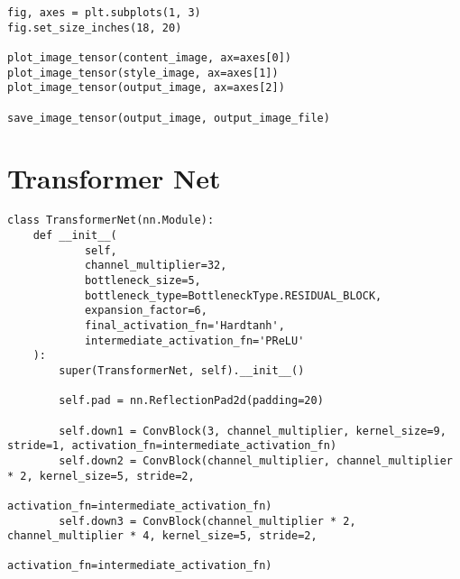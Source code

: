 \pagebreak

\begin{listing}[ht]
\begin{verbatim}
fig, axes = plt.subplots(1, 3)
fig.set_size_inches(18, 20)

plot_image_tensor(content_image, ax=axes[0])
plot_image_tensor(style_image, ax=axes[1])
plot_image_tensor(output_image, ax=axes[2])

save_image_tensor(output_image, output_image_file)
\end{verbatim}
\label{lst:neural_style_transfer_6}
\end{listing}

\pagebreak


\section{Transformer Net}
\label{sec:transformer_net_full}


\begin{listing}[ht]
\begin{verbatim}
class TransformerNet(nn.Module):
    def __init__(
            self,
            channel_multiplier=32,
            bottleneck_size=5,
            bottleneck_type=BottleneckType.RESIDUAL_BLOCK,
            expansion_factor=6,
            final_activation_fn='Hardtanh',
            intermediate_activation_fn='PReLU'
    ):
        super(TransformerNet, self).__init__()

        self.pad = nn.ReflectionPad2d(padding=20)

        self.down1 = ConvBlock(3, channel_multiplier, kernel_size=9, stride=1, activation_fn=intermediate_activation_fn)
        self.down2 = ConvBlock(channel_multiplier, channel_multiplier * 2, kernel_size=5, stride=2,
                               activation_fn=intermediate_activation_fn)
        self.down3 = ConvBlock(channel_multiplier * 2, channel_multiplier * 4, kernel_size=5, stride=2,
                               activation_fn=intermediate_activation_fn)
\end{verbatim}
\label{lst:transformer_net_full_1}
\end{listing}

\pagebreak

